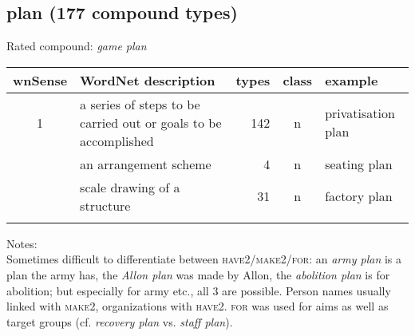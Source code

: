 \subsection{plan      (177 compound types)}
Rated compound: \emph{game plan}

\vspace*{1ex}

\noindent
\begin{longtable}{c>{\raggedright\arraybackslash}p{5cm}rc>{\raggedright\arraybackslash}p{2cm}}\lsptoprule
{\small wnSense}&WordNet description&types&class&example\\\midrule
1&a series of steps to be carried out or goals to be accomplished&142&n&privatisation plan\\\tablevspace
2&an arrangement scheme&4&n&seating plan\\\tablevspace
3&scale drawing of a structure&31&n&factory plan\\\lspbottomrule
\end{longtable}

\noindent
Notes:\\
Sometimes difficult to differentiate between \textsc{have2}/\textsc{make2}/\textsc{for}: an \emph{army plan} is a plan the army has, the \emph{Allon plan} was made by Allon, the \emph{abolition plan} is for abolition; but especially for army etc., all 3 are possible. Person names usually linked with \textsc{make2}, organizations with \textsc{have2}. \textsc{for} was used for aims as well as target groups (cf. \emph{recovery plan} vs. \emph{staff plan}).

